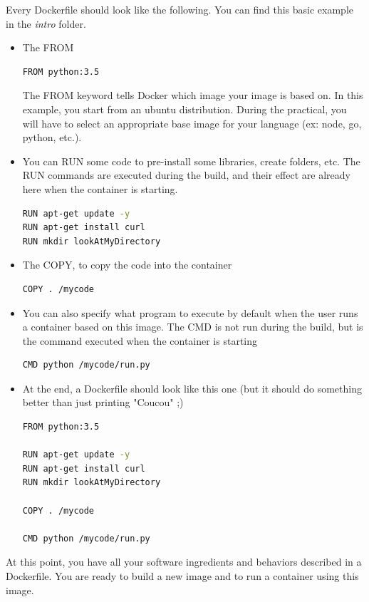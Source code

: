 \documentclass[a4paper,11pt]{exam}
\begin{document}
Every Dockerfile should look like the following. You can find this basic example in the \textit{intro} folder.
\begin{itemize}

	\item The FROM
		\begin{lstlisting}[frame=single,language={sh}]
FROM python:3.5
	\end{lstlisting}
	The FROM keyword tells Docker which image your image is based on. In this example, you start from an ubuntu distribution. During the practical, you will have to select an appropriate base image for your language (ex: node, go, python, etc.).

	
	\item You can RUN some code to pre-install some libraries, create folders, etc. The RUN commands are executed during the build, and their effect are already here when the container is starting.

\begin{lstlisting}[frame=single,language={sh}]
RUN apt-get update -y
RUN apt-get install curl
RUN mkdir lookAtMyDirectory
\end{lstlisting}

\item The COPY, to copy the code into the container

\begin{lstlisting}[frame=single,language={sh}]
COPY . /mycode
\end{lstlisting}

	\item You can also specify what program to execute by default when the user runs a container based on this image. The CMD is not run during the build, but is the command executed when the container is starting

\begin{lstlisting}[frame=single,language={sh}]
CMD python /mycode/run.py
\end{lstlisting}	
	
	\item At the end, a Dockerfile should look like this one (but it should do something better than just printing "Coucou" ;) 
	
\begin{lstlisting}[frame=single,language={sh}]
FROM python:3.5

RUN apt-get update -y
RUN apt-get install curl
RUN mkdir lookAtMyDirectory

COPY . /mycode

CMD python /mycode/run.py
\end{lstlisting}	

\end{itemize}
At this point, you have all your software ingredients and behaviors described in a Dockerfile. You are ready to build a new image and to run a container using this image.
\end{document}
